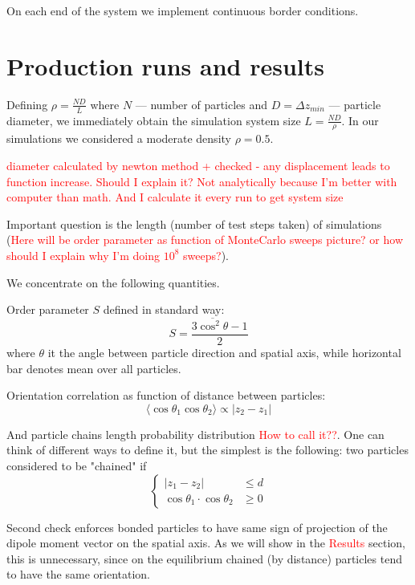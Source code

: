\documentclass[12pt,a4paper]{article}
\begin{document}
On each end of the system we implement continuous border conditions.

\section{Production runs and results}

Defining $\rho = \frac{N D}{L}$ where $N$ --- number of particles and $D = \Delta z_{min}$ --- particle diameter, we immediately obtain the simulation system size $L = \frac{N D}{\rho}$. In our simulations we considered a moderate density $\rho = 0.5$.

\textcolor{red}{diameter calculated by newton method + checked - any displacement leads to function increase. Should I explain it? Not analytically because I'm better with computer than math. And I calculate it every run to get system size}

Important question is the length (number of test steps taken) of simulations (\textcolor{red}{Here will be order parameter as function of MonteCarlo sweeps picture? or how should I explain why I'm doing $10^8$ sweeps?}).

We concentrate on the following quantities.

Order parameter $S$ defined in standard way:
\begin{equation}
S = \frac{3 \overline{\cos^2 \theta} - 1}{2}
\end{equation}
where $\theta$ it the angle between particle direction and spatial axis, while horizontal bar denotes mean over all particles.

Orientation correlation as function of distance between particles:
\begin{equation}
\langle\cos \theta_1 \cos \theta_2\rangle \propto |z_2 - z_1|
\end{equation}

And particle chains length probability distribution \textcolor{red}{How to call it??}. One can think of different ways to define it, but the simplest is the following: two particles considered to be "chained" if 
\begin{equation}
\begin{cases}
	|z_1 - z_2| &\leq d\\
	\cos \theta_1 \cdot \cos \theta_2 &\geq 0
\end{cases}
\end{equation}

Second check enforces bonded particles to have same sign of projection of the dipole moment vector on the spatial axis. As we will show in the \textcolor{red}{Results} section, this is unnecessary, since on the equilibrium chained (by distance) particles tend to have the same orientation.

\cite{Camp2000}



\end{document}
